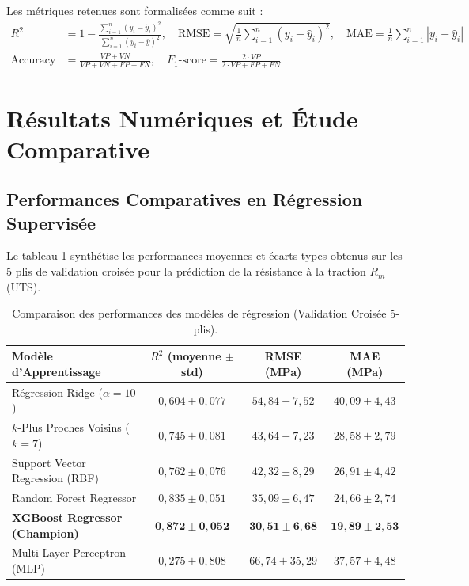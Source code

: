 \documentclass[11pt,a4paper]{article}
\begin{document}
Les métriques retenues sont formalisées comme suit :
\begin{align}
    R^2 &= 1 - \frac{\sum_{i=1}^n (y_i - \hat{y}_i)^2}{\sum_{i=1}^n (y_i - \bar{y})^2}, \quad
    \text{RMSE} = \sqrt{\frac{1}{n}\sum_{i=1}^n (y_i - \hat{y}_i)^2}, \quad
    \text{MAE} = \frac{1}{n}\sum_{i=1}^n |y_i - \hat{y}_i| \\
    \text{Accuracy} &= \frac{VP + VN}{VP + VN + FP + FN}, \quad
    F_1\text{-score} = \frac{2 \cdot VP}{2 \cdot VP + FP + FN}
\end{align}

\section{Résultats Numériques et Étude Comparative}
\label{sec:resultats}

\subsection{Performances Comparatives en Régression Supervisée}
Le tableau \ref{tab:regression} synthétise les performances moyennes et écarts-types obtenus sur les 5 plis de validation croisée pour la prédiction de la résistance à la traction $R_m$ (UTS).

\begin{table}[H]
\centering
\caption{Comparaison des performances des modèles de régression (Validation Croisée 5-plis).}
\label{tab:regression}
\small
\begin{tabular}{lccc}
\toprule
\textbf{Modèle d'Apprentissage} & \textbf{$R^2$ (moyenne $\pm$ std)} & \textbf{RMSE (MPa)} & \textbf{MAE (MPa)} \\
\midrule
Régression Ridge ($\alpha=10$) & $0{,}604 \pm 0{,}077$ & $54{,}84 \pm 7{,}52$ & $40{,}09 \pm 4{,}43$ \\
$k$-Plus Proches Voisins ($k=7$) & $0{,}745 \pm 0{,}081$ & $43{,}64 \pm 7{,}23$ & $28{,}58 \pm 2{,}79$ \\
Support Vector Regression (RBF) & $0{,}762 \pm 0{,}076$ & $42{,}32 \pm 8{,}29$ & $26{,}91 \pm 4{,}42$ \\
Random Forest Regressor & $0{,}835 \pm 0{,}051$ & $35{,}09 \pm 6{,}47$ & $24{,}66 \pm 2{,}74$ \\
\textbf{XGBoost Regressor (Champion)} & $\mathbf{0{,}872 \pm 0{,}052}$ & $\mathbf{30{,}51 \pm 6{,}68}$ & $\mathbf{19{,}89 \pm 2{,}53}$ \\
Multi-Layer Perceptron (MLP) & $0{,}275 \pm 0{,}808$ & $66{,}74 \pm 35{,}29$ & $37{,}57 \pm 4{,}48$ \\
\bottomrule
\end{tabular}
\end{table}
\end{document}
